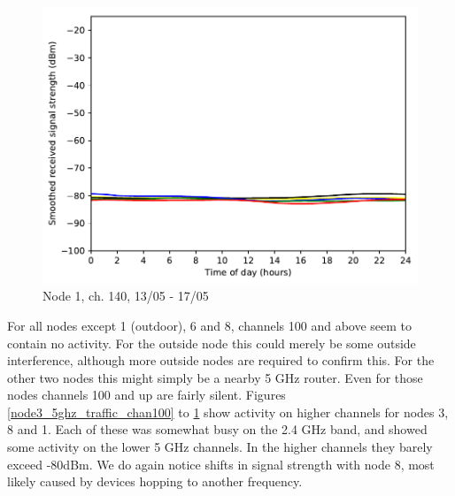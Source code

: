 \documentclass[a4paper, 11pt]{article}
\begin{document}
\begin{figure}[ht]
\begin{minipage}{0.47\textwidth}
\centering
\includegraphics[width=\textwidth]{images/5_GHz/node1_2017-05-17_chan140_image.pdf}
\caption{Node 1, ch. 140, 13/05 - 17/05}
\label{node1_5ghz_traffic_chan140}
\end{minipage}\hfill
\end{figure}
For all nodes except 1 (outdoor), 6 and 8, channels 100 and above seem to contain no activity. For the outside node this could merely be some outside interference, although more outside nodes are required to confirm this. For the other two nodes this might simply be a nearby 5 GHz router. Even for those nodes channels 100 and up are fairly silent.
Figures \ref{node3_5ghz_traffic_chan100} to \ref{node1_5ghz_traffic_chan140} show activity on higher channels for nodes 3, 8 and 1. Each of these was somewhat busy on the 2.4 GHz band, and showed some activity on the lower 5 GHz channels. In the higher channels they barely exceed -80dBm. We do again notice shifts in signal strength with node 8, most likely caused by devices hopping to another frequency.
\end{document}
